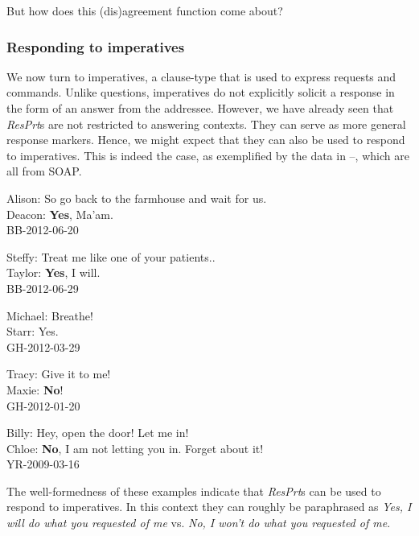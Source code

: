 \documentclass[output=paper]{LSP/langsci}
\begin{document}
\noindent But how does this (dis)agreement function come about?  

\subsubsection{{Responding to imperatives}}

We now turn to imperatives, a clause-type that is used to express requests and commands. Unlike questions, imperatives do not explicitly solicit a response in the form of an answer from the addressee.
However, we have already seen that \textit{ResPrt}s are not restricted to answering contexts. They can serve as more general response markers. Hence, we might expect that they can also be used to respond to imperatives. This is indeed the case, as exemplified by the data in --, which are all from SOAP. 

\ea\label{ex:wiltschko:34}
Alison:   {So go back to the farmhouse and wait for us}. \\
Deacon:   \textbf{{Yes}}{, Ma'am.} \\
BB-2012-06-20
\z

\ea\label{ex:wiltschko:35}
Steffy:     {Treat me like one of your patients..} \\
Taylor:   \textbf{{Yes}}{, I will.} \\
BB-2012-06-29
\z

\ea\label{ex:wiltschko:36}
Michael:   {Breathe}{!}\\
Starr:     {{Yes}}. \\
GH-2012-03-29
\z

\ea\label{ex:wiltschko:37}
Tracy:     {Give it to me!} \\
Maxie:   \textbf{{No}}{!}\\ 
GH-2012-01-20
\z

\ea\label{ex:wiltschko:38}
Billy:    {Hey, open the door! Let me in!} \\
Chloe:     \textbf{{No}}{, I am not letting you in. Forget about it!}\\
YR-2009-03-16
\z

The well-formedness of these examples indicate that \textit{ResPrt}s can be used to respond to imperatives. In this context they can roughly be paraphrased as \textit{Yes, I will do what you requested of me} vs. \textit{No, I won’t do what you requested of me}. 
\end{document}
